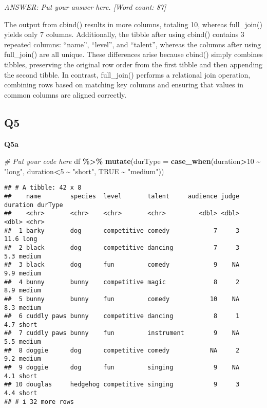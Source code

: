 \documentclass[
]{article}
\newenvironment{Shaded}{\begin{snugshade}}{\end{snugshade}}
\newcommand{\AttributeTok}[1]{\textcolor[rgb]{0.13,0.29,0.53}{#1}}
\newcommand{\CommentTok}[1]{\textcolor[rgb]{0.56,0.35,0.01}{\textit{#1}}}
\newcommand{\ConstantTok}[1]{\textcolor[rgb]{0.56,0.35,0.01}{#1}}
\newcommand{\DecValTok}[1]{\textcolor[rgb]{0.00,0.00,0.81}{#1}}
\newcommand{\FunctionTok}[1]{\textcolor[rgb]{0.13,0.29,0.53}{\textbf{#1}}}
\newcommand{\NormalTok}[1]{#1}
\newcommand{\SpecialCharTok}[1]{\textcolor[rgb]{0.81,0.36,0.00}{\textbf{#1}}}
\newcommand{\StringTok}[1]{\textcolor[rgb]{0.31,0.60,0.02}{#1}}
\begin{document}
\emph{ANSWER: Put your answer here. {[}Word count: 87{]}}

The output from cbind() results in more columns, totaling 10, whereas
full\_join() yields only 7 columns. Additionally, the tibble after using
cbind() contains 3 repeated columns: ``name'', ``level'', and
``talent'', whereas the columns after using full\_join() are all unique.
These differences arise because cbind() simply combines tibbles,
preserving the original row order from the first tibble and then
appending the second tibble. In contrast, full\_join() performs a
relational join operation, combining rows based on matching key columns
and ensuring that values in common columns are aligned correctly.

\hypertarget{q5}{%
\subsection{Q5}\label{q5}}

\textbf{Q5a}

\begin{Shaded}
\begin{Highlighting}[]
\CommentTok{\# Put your code here}
\NormalTok{df }\SpecialCharTok{\%\textgreater{}\%}
  \FunctionTok{mutate}\NormalTok{(}\AttributeTok{durType =} \FunctionTok{case\_when}\NormalTok{(duration}\SpecialCharTok{\textgreater{}}\DecValTok{10} \SpecialCharTok{\textasciitilde{}} \StringTok{"long"}\NormalTok{,}
\NormalTok{                             duration}\SpecialCharTok{\textless{}}\DecValTok{5} \SpecialCharTok{\textasciitilde{}} \StringTok{"short"}\NormalTok{,}
                             \ConstantTok{TRUE} \SpecialCharTok{\textasciitilde{}} \StringTok{"medium"}\NormalTok{))}
\end{Highlighting}
\end{Shaded}

\begin{verbatim}
## # A tibble: 42 x 8
##    name        species  level       talent     audience judge duration durType
##    <chr>       <chr>    <chr>       <chr>         <dbl> <dbl>    <dbl> <chr>  
##  1 barky       dog      competitive comedy            7     3     11.6 long   
##  2 black       dog      competitive dancing           7     3      5.3 medium 
##  3 black       dog      fun         comedy            9    NA      9.9 medium 
##  4 bunny       bunny    competitive magic             8     2      8.9 medium 
##  5 bunny       bunny    fun         comedy           10    NA      8.3 medium 
##  6 cuddly paws bunny    competitive dancing           8     1      4.7 short  
##  7 cuddly paws bunny    fun         instrument        9    NA      5.5 medium 
##  8 doggie      dog      competitive comedy           NA     2      9.2 medium 
##  9 doggie      dog      fun         singing           9    NA      4.1 short  
## 10 douglas     hedgehog competitive singing           9     3      4.4 short  
## # i 32 more rows
\end{verbatim}
\end{document}
